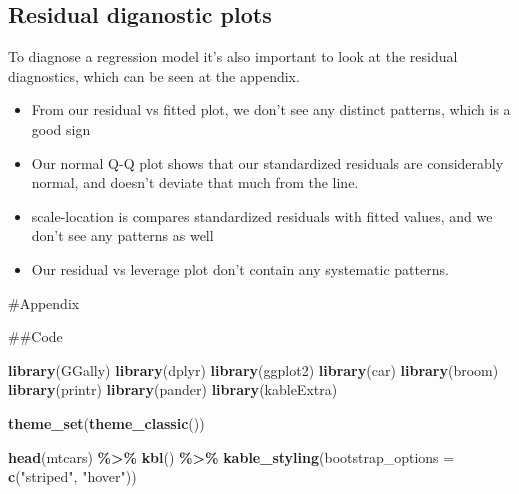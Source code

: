 \documentclass[
]{article}
\newenvironment{Shaded}{\begin{snugshade}}{\end{snugshade}}
\newcommand{\AttributeTok}[1]{\textcolor[rgb]{0.13,0.29,0.53}{#1}}
\newcommand{\FunctionTok}[1]{\textcolor[rgb]{0.13,0.29,0.53}{\textbf{#1}}}
\newcommand{\NormalTok}[1]{#1}
\newcommand{\SpecialCharTok}[1]{\textcolor[rgb]{0.81,0.36,0.00}{\textbf{#1}}}
\newcommand{\StringTok}[1]{\textcolor[rgb]{0.31,0.60,0.02}{#1}}
\providecommand{\tightlist}{%
  \setlength{\itemsep}{0pt}\setlength{\parskip}{0pt}}
\begin{document}
\subsection{Residual diganostic plots}\label{residual-diganostic-plots}

To diagnose a regression model it's also important to look at the
residual diagnostics, which can be seen at the appendix.

\begin{itemize}
\tightlist
\item
  From our residual vs fitted plot, we don't see any distinct patterns,
  which is a good sign
\item
  Our normal Q-Q plot shows that our standardized residuals are
  considerably normal, and doesn't deviate that much from the line.
\item
  scale-location is compares standardized residuals with fitted values,
  and we don't see any patterns as well
\item
  Our residual vs leverage plot don't contain any systematic patterns.
\end{itemize}

\#Appendix

\#\#Code

\begin{Shaded}
\begin{Highlighting}[]
\FunctionTok{library}\NormalTok{(GGally)}
\FunctionTok{library}\NormalTok{(dplyr)}
\FunctionTok{library}\NormalTok{(ggplot2)}
\FunctionTok{library}\NormalTok{(car)}
\FunctionTok{library}\NormalTok{(broom)}
\FunctionTok{library}\NormalTok{(printr)}
\FunctionTok{library}\NormalTok{(pander)}
\FunctionTok{library}\NormalTok{(kableExtra)}

\FunctionTok{theme\_set}\NormalTok{(}\FunctionTok{theme\_classic}\NormalTok{())}
\end{Highlighting}
\end{Shaded}

\begin{Shaded}
\begin{Highlighting}[]
\FunctionTok{head}\NormalTok{(mtcars) }\SpecialCharTok{\%\textgreater{}\%}
  \FunctionTok{kbl}\NormalTok{() }\SpecialCharTok{\%\textgreater{}\%}
  \FunctionTok{kable\_styling}\NormalTok{(}\AttributeTok{bootstrap\_options =} \FunctionTok{c}\NormalTok{(}\StringTok{"striped"}\NormalTok{, }\StringTok{"hover"}\NormalTok{))}
\end{Highlighting}
\end{Shaded}
\end{document}
